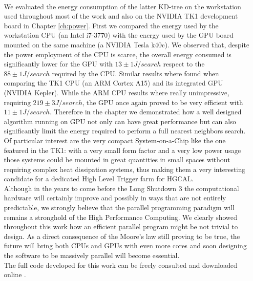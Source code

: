 \vspace{0.5cm}
\\
We evaluated the energy consumption of the latter KD-tree on the workstation used throughout most of the work and also on the NVIDIA TK1 development board in Chapter \ref{ch:power}. First we compared the energy used by the workstation CPU (an Intel i7-3770) with the energy used by the GPU board mounted on the same machine (a NVIDIA Tesla k40c). We observed that, despite the power employment of the CPU is scarce, the overall energy consumed is significantly lower for the GPU with $13 \pm 1 \unit{J/search}$ respect to the $88 \pm 1 \unit{J/search}$ required by the CPU. Similar results where found when comparing the TK1 CPU (an ARM Cortex A15) and its integrated GPU (NVIDIA Kepler). While the ARM CPU results where really unimpressive, requiring $219 \pm 3 \unit{J/search}$, the GPU once again proved to be very efficient with $11 \pm 1 \unit{J/search}$. Therefore in the chapter we demonstrated how a well designed algorithm running on GPU not only can have great performance but can also significantly limit the energy required to perform a full nearest neighbors search. Of particular interest are the very compact System-on-a-Chip like the one featured in the TK1: with a very small form factor and a very low power usage those systems could be mounted in great quantities in small spaces without requiring complex heat dissipation systems, thus making them a very interesting candidate for a dedicated High Level Trigger farm for HGCAL.
\vspace{0.5cm}
\\
Although in the years to come before the Long Shutdown 3 the computational hardware will certainly improve and possibly in ways that are not entirely predictable, we strongly believe that the parallel programming paradigm will remains a stronghold of the High Performance Computing. We clearly showed throughout this work how an efficient parallel program might be not trivial to design. As a direct consequence of the Moore's law still proving to be true, the future will bring both CPUs and GPUs with even more cores and soon designing the software to be massively parallel will become essential.
\vspace{0.5cm}
\\
The full code developed for this work can be freely consulted and downloaded online \cite{github}.